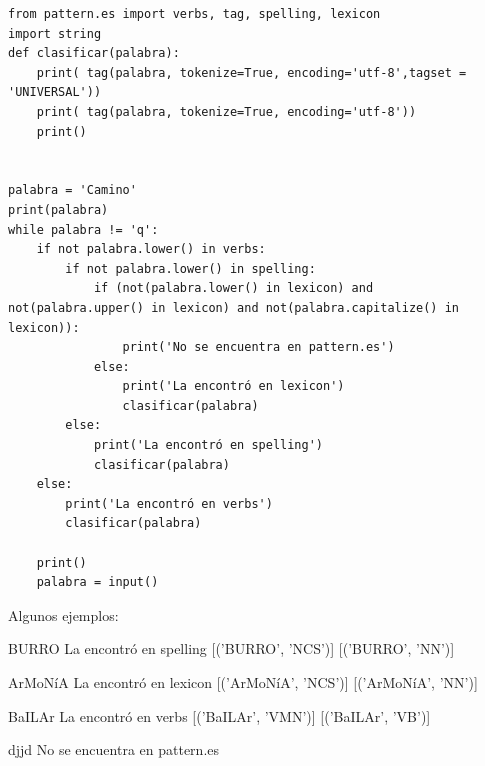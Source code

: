 \begin{verbatim}
from pattern.es import verbs, tag, spelling, lexicon
import string
def clasificar(palabra):
	print( tag(palabra, tokenize=True, encoding='utf-8',tagset = 'UNIVERSAL'))
	print( tag(palabra, tokenize=True, encoding='utf-8'))
	print()


palabra = 'Camino'
print(palabra)
while palabra != 'q':
	if not palabra.lower() in verbs:
		if not palabra.lower() in spelling:
			if (not(palabra.lower() in lexicon) and not(palabra.upper() in lexicon) and not(palabra.capitalize() in lexicon)):
				print('No se encuentra en pattern.es')
			else:
				print('La encontró en lexicon')
				clasificar(palabra)
		else:
			print('La encontró en spelling')
			clasificar(palabra)
	else:
		print('La encontró en verbs')
		clasificar(palabra)
			
	print()
	palabra = input()
\end{verbatim}
Algunos ejemplos:
\begin{cverbatim}
BURRO
La encontró en spelling
[('BURRO', 'NCS')]
[('BURRO', 'NN')]

ArMoNíA
La encontró en lexicon
[('ArMoNíA', 'NCS')]
[('ArMoNíA', 'NN')]

BaILAr
La encontró en verbs
[('BaILAr', 'VMN')]
[('BaILAr', 'VB')]

djjd
No se encuentra en pattern.es
\end{cverbatim}